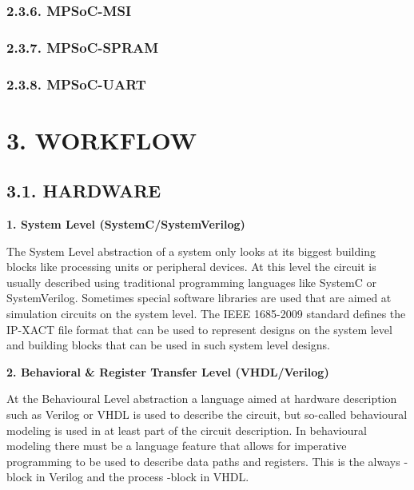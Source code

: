 \documentclass[]{article}
\begin{document}
\hypertarget{mpsoc-msi}{%
\subsubsection{2.3.6. MPSoC-MSI}\label{mpsoc-msi}}

\hypertarget{mpsoc-spram}{%
\subsubsection{2.3.7. MPSoC-SPRAM}\label{mpsoc-spram}}

\hypertarget{mpsoc-uart}{%
\subsubsection{2.3.8. MPSoC-UART}\label{mpsoc-uart}}

\hypertarget{workflow}{%
\section{3. WORKFLOW}\label{workflow}}

\hypertarget{hardware}{%
\subsection{3.1. HARDWARE}\label{hardware}}

\textbf{1. System Level (SystemC/SystemVerilog)}

The System Level abstraction of a system only looks at its biggest
building blocks like processing units or peripheral devices. At this
level the circuit is usually described using traditional programming
languages like SystemC or SystemVerilog. Sometimes special software
libraries are used that are aimed at simulation circuits on the system
level. The IEEE 1685-2009 standard defines the IP-XACT file format that
can be used to represent designs on the system level and building blocks
that can be used in such system level designs.

\textbf{2. Behavioral \& Register Transfer Level (VHDL/Verilog)}

At the Behavioural Level abstraction a language aimed at hardware
description such as Verilog or VHDL is used to describe the circuit, but
so-called behavioural modeling is used in at least part of the circuit
description. In behavioural modeling there must be a language feature
that allows for imperative programming to be used to describe data paths
and registers. This is the always -block in Verilog and the process
-block in VHDL.
\end{document}
